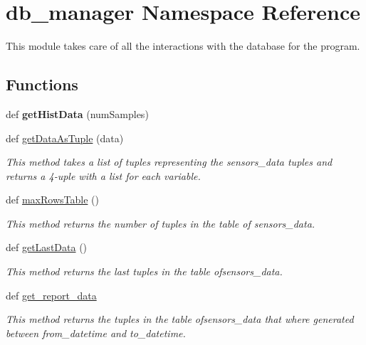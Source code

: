 \hypertarget{namespacedb__manager}{}\section{db\+\_\+manager Namespace Reference}
\label{namespacedb__manager}


This module takes care of all the interactions with the database for the program.  


\subsection*{Functions}
\begin{DoxyCompactItemize}
\item 
\mbox{\label{namespacedb__manager_a52beb05623c4a2554c6906bf68c5cb05}} 
def {\bfseries get\+Hist\+Data} (num\+Samples)
\item 
def \hyperlink{namespacedb__manager_aede421c7e85653db00e136c3a8b5afe3}{get\+Data\+As\+Tuple} (data)
\begin{DoxyCompactList}\small\item\em This method takes a list of tuples representing the \textquotesingle{}sensors\+\_\+data\textquotesingle{} tuples and returns a 4-\/uple with a list for each variable. \end{DoxyCompactList}\item 
def \hyperlink{namespacedb__manager_ad711f55854b3bd88f770264bac6cfb98}{max\+Rows\+Table} ()
\begin{DoxyCompactList}\small\item\em This method returns the number of tuples in the table of \textquotesingle{}sensors\+\_\+data\textquotesingle{}. \end{DoxyCompactList}\item 
def \hyperlink{namespacedb__manager_a2fa0c3f4bc530922125dabd2714bb28e}{get\+Last\+Data} ()
\begin{DoxyCompactList}\small\item\em This method returns the last tuples in the table of\textquotesingle{}sensors\+\_\+data\textquotesingle{}. \end{DoxyCompactList}\item 
def \hyperlink{namespacedb__manager_aee66056354dad1518adcff1915f4a1cf}{get\+\_\+report\+\_\+data}
\begin{DoxyCompactList}\small\item\em This method returns the tuples in the table of\textquotesingle{}sensors\+\_\+data\textquotesingle{} that where generated between \textquotesingle{}from\+\_\+datetime\textquotesingle{} and \textquotesingle{}to\+\_\+datetime\textquotesingle{}. \end{DoxyCompactList}\item 

\end{DoxyCompactItemize}

